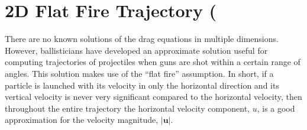 \documentclass[11pt]{book}
\begin{document}
%
%

\clearpage

\newpage

\section{2D Flat Fire Trajectory (\texorpdfstring{})}

There are no known solutions of the drag equations in multiple dimensions. However, ballisticians have developed an approximate solution useful for computing trajectories of projectiles when guns are shot within a certain range of angles. This solution makes use of the ``flat fire'' assumption. In short, if a particle is launched with its velocity in only the horizontal direction and its vertical velocity is never very significant compared to the horizontal velocity, then throughout the entire trajectory the horizontal velocity component, $u$, is a good approximation for the velocity magnitude, $|\mathbf{u}|$.
\end{document}
